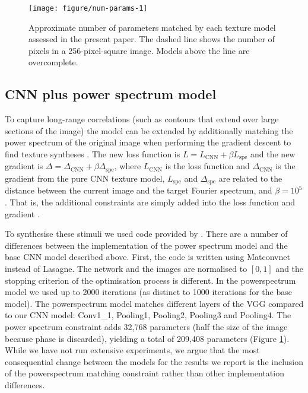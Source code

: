 \documentclass[doc, 11pt,a4paper,natbib]{apa6}\usepackage[]{graphicx}\usepackage[]{color}
\makeatletter
\def\maxwidth{ %
  \ifdim\Gin@nat@width>\linewidth
    \linewidth
  \else
    \Gin@nat@width
  \fi
}
\newenvironment{knitrout}{}{} %
\makeatother
\begin{document}
\begin{knitrout}
\color{fgcolor}\begin{figure}
\texttt{[image: figure/num-params-1]} \caption[Approximate number of parameters matched by each texture model assessed in the present paper]{Approximate number of parameters matched by each texture model assessed in the present paper. The dashed line shows the number of pixels in a 256-pixel-square image. Models above the line are overcomplete.}\label{fig:num-params}
\end{figure}


\end{knitrout}


\subsection{CNN plus power spectrum model}

To capture long-range correlations (such as contours that extend over large sections of the image) the model can be extended by additionally matching the power spectrum of the original image when performing the gradient descent to find texture syntheses \citep{liu_texture_2016}. 
The new loss function is $L = L_{\mathrm{CNN}} + \beta L_{\mathrm{spe}}$ 
and the new gradient is  $\Delta = \Delta_{\mathrm{CNN}} + \beta \Delta_{\mathrm{spe}}$, 
where $L_{\mathrm{CNN}}$ is the loss function and $\Delta_{\mathrm{CNN}}$ is the gradient from the pure CNN texture model, $L_{\mathrm{spe}}$ and $\Delta_{\mathrm{spe}}$ are related to the distance between the current image and the target Fourier spectrum, and $\beta = 10^5$.
That is, the additional constraints are simply added into the loss function and gradient \citep[see][for further details]{liu_texture_2016}.

To synthesise these stimuli we used code provided by \citet{liu_texture_2016}.
There are a number of differences between the implementation of the power spectrum model and the base CNN model described above. 
First, the code is written using Matconvnet instead of Lasagne. 
The network and the images are normalised to $[0,1]$ and the stopping criterion of the optimisation process is different.
In the powerspectrum model we used up to 2000 iterations (as distinct to 1000 iterations for the base model). 
The powerspectrum model matches different layers of the VGG compared to our CNN model: Conv1\_1, Pooling1, Pooling2, Pooling3 and Pooling4.
The power spectrum constraint adds 32,768 parameters (half the size of the image because phase is discarded), yielding a total of 209,408 parameters (Figure \ref{fig:num-params}).
While we have not run extensive experiments, we argue that the most consequential change between the models for the results we report is the inclusion of the powerspectrum matching constraint rather than other implementation differences.
\end{document}
